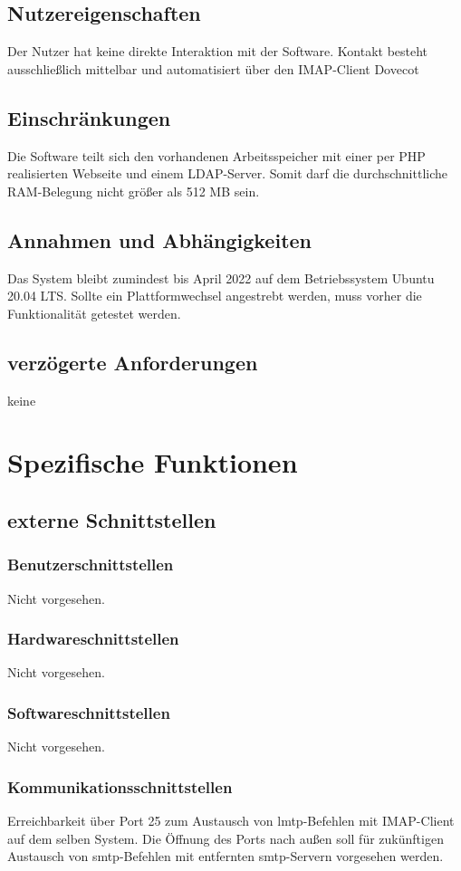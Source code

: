 \subsection{Nutzereigenschaften}
Der Nutzer hat keine direkte Interaktion mit der Software. Kontakt besteht ausschließlich mittelbar und automatisiert über den IMAP-Client Dovecot
\subsection{Einschränkungen}
Die Software teilt sich den vorhandenen Arbeitsspeicher mit einer per PHP realisierten Webseite und einem LDAP-Server. Somit darf die durchschnittliche RAM-Belegung nicht größer als 512 MB sein.
\subsection{Annahmen und Abhängigkeiten}
Das System bleibt zumindest bis April 2022 auf dem Betriebssystem Ubuntu 20.04 LTS. Sollte ein Plattformwechsel angestrebt werden, muss vorher die Funktionalität getestet werden.
\subsection{verzögerte Anforderungen}
keine 
\section{Spezifische Funktionen}

\subsection{externe Schnittstellen}
\subsubsection*{Benutzerschnittstellen}
Nicht vorgesehen.
\subsubsection*{Hardwareschnittstellen}
Nicht vorgesehen.
\subsubsection*{Softwareschnittstellen}
Nicht vorgesehen.
\subsubsection*{Kommunikationsschnittstellen}
Erreichbarkeit über Port 25 zum Austausch von \ac{lmtp}-Befehlen mit IMAP-Client auf dem selben System. Die Öffnung des Ports nach außen soll für zukünftigen Austausch von \ac{smtp}-Befehlen mit entfernten \ac{smtp}-Servern vorgesehen werden.
